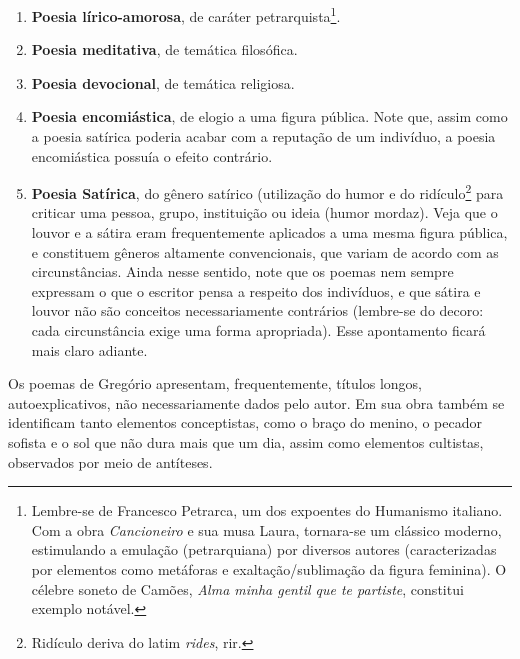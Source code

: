 \begin{enumerate}
\item \textbf{Poesia lírico-amorosa}, de caráter petrarquista\footnote{Lembre-se de Francesco Petrarca, um dos expoentes do Humanismo italiano. Com a obra \textit{Cancioneiro} e sua musa Laura, tornara-se um clássico moderno, estimulando a emulação (petrarquiana) por diversos autores (caracterizadas por elementos como metáforas e exaltação/sublimação da figura feminina). O célebre soneto de Camões, \textit{Alma minha gentil que te partiste}, constitui exemplo notável.}.
\item \textbf{Poesia meditativa}, de temática filosófica.
\item \textbf{Poesia devocional}, de temática religiosa.
\item \textbf{Poesia encomiástica}, de elogio a uma figura pública. Note que, assim como a poesia satírica poderia acabar com a reputação de um indivíduo, a poesia encomiástica possuía o efeito contrário.
\item \textbf{Poesia Satírica}, do gênero satírico (utilização do humor e do ridículo\footnote{Ridículo deriva do latim \textit{rides}, rir.} para criticar uma pessoa, grupo, instituição ou ideia (humor mordaz). Veja que o louvor e a sátira eram frequentemente aplicados a uma mesma figura pública, e constituem gêneros altamente convencionais, que variam de acordo com as circunstâncias. Ainda nesse sentido, note que os poemas nem sempre expressam o que o escritor pensa a respeito dos indivíduos, e que sátira e louvor não são conceitos necessariamente contrários (lembre-se do decoro: cada circunstância exige uma forma apropriada). Esse apontamento ficará mais claro adiante.
\end{enumerate}

Os poemas de Gregório apresentam, frequentemente, títulos longos, autoexplicativos, não necessariamente dados pelo autor. Em sua obra também se identificam tanto elementos conceptistas, como o braço do menino, o pecador sofista e o sol que não dura mais que um dia, assim como elementos cultistas, observados por meio de antíteses.


